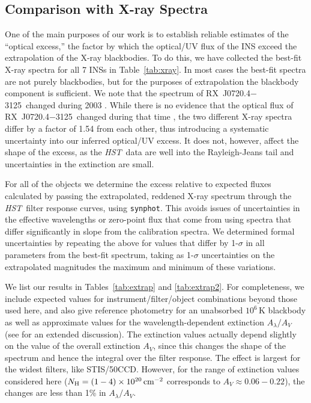 \documentclass[iop]{emulateapj}
\newcommand{\expnt}[2]{\ensuremath{#1 \times 10^{#2}}}   %
\newcommand{\rxjk}{RX~J0720.4$-$3125}
\newcommand{\hst}{{\em HST}}
\begin{document}
\subsection{Comparison with X-ray Spectra}
One of the main purposes of our work is to establish reliable
estimates of the ``optical excess,'' the factor by which the
optical/UV flux of the INS exceed the extrapolation of the X-ray
blackbodies.  To do this, we have collected the best-fit X-ray spectra
for all 7 INSs in Table~\ref{tab:xray}.  In most cases the best-fit
spectra are not purely blackbodies, but for the purposes of
extrapolation the blackbody component is sufficient.  We note that the
spectrum of \rxjk\ changed during 2003 \citep{dvvmv04}.  While there
is no evidence that the optical flux of \rxjk\ changed during that
time \citep*{kvka07}, the two different X-ray spectra differ by a
factor of 1.54 from each other, thus introducing a systematic
uncertainty into our inferred optical/UV excess.  It does not,
however, affect the shape of the excess, as the \hst\ data are well
into the Rayleigh-Jeans tail and uncertainties in the extinction are
small.

For all of the objects we determine the excess relative to expected
fluxes calculated by passing the extrapolated, reddened X-ray spectrum
through the \hst\ filter response curves, using \texttt{synphot}.
This avoids issues of uncertainties in the effective wavelengths or
zero-point flux that come from using spectra that differ significantly
in slope from the calibration spectra.  We determined formal
uncertainties by repeating the above for values that differ by
1-$\sigma$ in all parameters from the best-fit spectrum, taking as
1-$\sigma$ uncertainties on the extrapolated magnitudes the maximum
and minimum of these variations.  

We list our results in Tables~\ref{tab:extrap} and \ref{tab:extrap2}.  For completeness, we
include expected values for instrument/filter/object combinations
beyond those used here, and also give reference photometry for an
unabsorbed $10^6\,$K blackbody as well as approximate values for the
wavelength-dependent extinction $A_\lambda/A_V$ (see \citealt{vkk01}
for an extended discussion).  The extinction values actually depend
slightly on the value of the overall extinction $A_V$, since this
changes the shape of the spectrum and hence the integral over the
filter response.  The effect is largest for the widest filters, like
STIS/50CCD.  However, for the range of extinction values considered
here ($N_{\rm H}=\expnt{(1-4)}{20}\,{\rm cm}^{-2}$ corresponds to
$A_V\approx 0.06-0.22$), the changes are less than 1\% in
$A_\lambda/A_V$.
\end{document}

